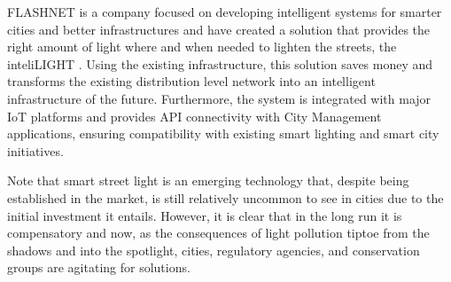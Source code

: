 FLASHNET is a company focused on developing intelligent systems for smarter cities and better infrastructures and have created a solution that provides the right amount of light where and when needed to lighten the streets, the inteliLIGHT \cite{inteli_light}. Using the existing infrastructure, this solution saves money and transforms the existing distribution level network into an intelligent infrastructure of the future. Furthermore, the system is integrated with major IoT platforms and provides API connectivity with City Management applications, ensuring compatibility with existing smart lighting and smart city initiatives.

Note that smart street light is an emerging technology that, despite being established in the market, is still relatively uncommon to see in cities due to the initial investment it entails. However, it is clear that in the long run it is compensatory and now, as the consequences of light pollution tiptoe from the shadows and into the spotlight, cities, regulatory agencies, and conservation groups are agitating for solutions.